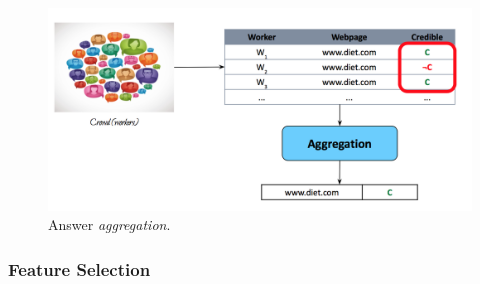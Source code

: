 \begin{figure}[H]%
 \centering
 \includegraphics[width=13cm]{./img/08/aggregation}
 \caption{\label{pic:aggregation} Answer \emph{aggregation}.}
\end{figure}


\subsubsection{Feature Selection}

